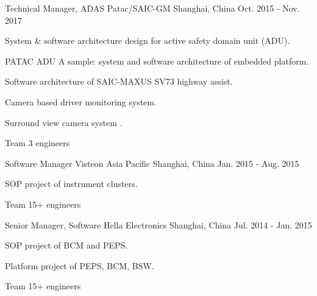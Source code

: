 \documentclass[../cv.tex]{subfiles}
\begin{document}
\begin{cventries}
	\cventry
	{Technical Manager, ADAS} %
	{Patac/SAIC-GM} %
	{Shanghai, China} %
	{Oct. 2015 - Nov. 2017} %
	{
		\begin{cvitems}
			\item System \& software architecture design for active safety domain unit (ADU).
			\item PATAC ADU A sample: system and software architecture of embedded platform.
			\item Software architecture of SAIC-MAXUS SV73 highway assist.
			\item Camera based driver monitoring system.
			\item Surround view camera system \supercite{Xin_RearView_17}.
			\item Team 3 engineers
		\end{cvitems}
	}


	\cventry
	{Software Manager} %
	{Visteon Asia Pacific} %
	{Shanghai, China} %
	{Jan. 2015 - Aug. 2015} %
	{
		\begin{cvitems}
			\item SOP project of instrument clusters.
			\item Team 15+ engineers
		\end{cvitems}
	}

	\cventry
	{Senior Manager, Software} %
	{Hella Electronics} %
	{Shanghai, China} %
	{Jul. 2014 - Jan. 2015} %
	{
		\begin{cvitems}
			\item SOP project of BCM and PEPS.
			\item Platform project of PEPS, BCM, BSW.
			\item Team 15+ engineers
		\end{cvitems}
	}


\end{cventries}
\end{document}
